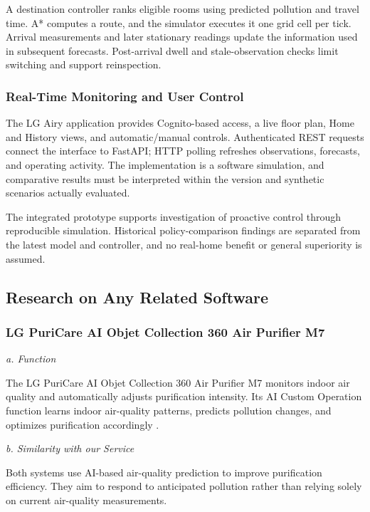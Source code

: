 \documentclass[conference]{IEEEtran}
\begin{document}
A destination controller ranks eligible rooms using predicted pollution and travel time. A* computes a route, and the simulator executes it one grid cell per tick. Arrival measurements and later stationary readings update the information used in subsequent forecasts. Post-arrival dwell and stale-observation checks limit switching and support reinspection.

\subsubsection{Real-Time Monitoring and User Control}

The LG Airy application provides Cognito-based access, a live floor plan, Home and History views, and automatic/manual controls. Authenticated REST requests connect the interface to FastAPI; HTTP polling refreshes observations, forecasts, and operating activity. The implementation is a software simulation, and comparative results must be interpreted within the version and synthetic scenarios actually evaluated.

The integrated prototype supports investigation of proactive control through reproducible simulation. Historical policy-comparison findings are separated from the latest model and controller, and no real-home benefit or general superiority is assumed.

\subsection{Research on Any Related Software}

\subsubsection{LG PuriCare AI Objet Collection 360\textdegree{} Air Purifier M7}

\emph{a. Function}

The LG PuriCare AI Objet Collection 360\textdegree{} Air Purifier M7 monitors indoor air quality and automatically adjusts purification intensity. Its AI Custom Operation function learns indoor air-quality patterns, predicts pollution changes, and optimizes purification accordingly \cite{ref1,ref2,ref3}.

\emph{b. Similarity with our Service}

Both systems use AI-based air-quality prediction to improve purification efficiency. They aim to respond to anticipated pollution rather than relying solely on current air-quality measurements.
\end{document}

